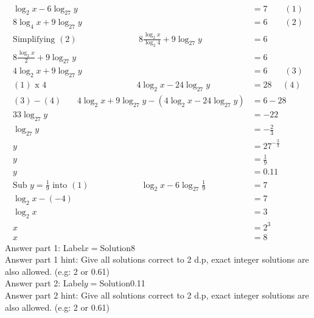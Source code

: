 \documentclass{article}
\begin{document}
\\[-35pt]\begin{align*}
\log_{2}x-6\log_{27}y&=7\qquad (1)\\[2pt]
8\log_{4}x+9\log_{27}y&=6\qquad (2)\\[2pt]
\text{Simplifying}\,\,(2)\hspace{87pt}8\displaystyle\frac{\log_{2}x}{\log_{2}4}+9\log_{27}y&=6\\[2pt]
8\displaystyle\frac{\log_{2}x}{2}+9\log_{27}y&=6\\[2pt]
4\log_{2}x+9\log_{27}y&=6\qquad (3)\\[2pt]
(1)\,\,\text{x}\,\,4\hspace{127pt} 4\log_{2}x-24\log_{27}y&=28\hspace{15pt} (4)\\[2pt]
(3)-(4)\hspace{22pt}4\log_{2}x+9\log_{27}y-(4\log_{2}x-24\log_{27}y)&=6-28\\[2pt]
33\log_{27}y&=-22\\[2pt]
\log_{27}y&=-\displaystyle\frac{2}{3}\\[2pt]
y&=27^{-\frac{2}{3}}\\[2pt]
y&=\displaystyle\frac{1}{9}\\[2pt]
y&=0.11\\[12pt]
\text{Sub}\,\,y=\displaystyle\frac{1}{9}\,\,\text{into}\,\,(1)\hspace{73pt}\log_{2}x-6\log_{27}\displaystyle\frac{1}{9}&=7\\[2pt]
\log_{2}x-(-4)&=7\\[2pt]
\log_{2}x&=3\\[2pt]
x&=2^3\\[2pt]
x&=8
\end{align*}
Answer part 1: \hspace{10pt}Label\hspace{10pt}$x=$\hspace{10pt}Solution\hspace{10pt}8\\
Answer part 1 hint: \hspace{15pt}Give all solutions correct to 2 d.p, exact integer solutions are also allowed. (e.g: 2 or 0.61)\\
Answer part 2: \hspace{10pt}Label\hspace{10pt}$y=$\hspace{10pt}Solution\hspace{10pt}0.11\\
Answer part 2 hint: \hspace{15pt}Give all solutions correct to 2 d.p, exact integer solutions are also allowed. (e.g: 2 or 0.61)\\
\end{document}
